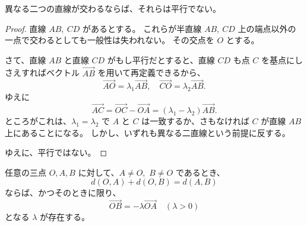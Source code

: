 \begin{thm}
  異なる二つの直線が交わるならば、それらは平行でない。
\end{thm}

\begin{proof}
  直線 \(AB,\:CD\) があるとする。
  これらが半直線 \(AB,\:CD\) 上の端点以外の一点で交わるとしても一般性は失われない。
  その交点を \(O\) とする。

  さて、直線 \(AB\) と直線 \(CD\) がもし平行だとすると、直線 \(CD\) も点 \(C\) を基点にしさえすればベクトル \(\overrightarrow{AB}\) を用いて再定義できるから、
  \[\overrightarrow{AO}=\lambda_1\overrightarrow{AB},\quad \overrightarrow{CO}=\lambda_2\overrightarrow{AB}.\]
  ゆえに
  \[\overrightarrow{AC}=\overrightarrow{OC}-\overrightarrow{OA}=(\lambda_1-\lambda_2)\overrightarrow{AB}.\]
  ところがこれは、\(\lambda_1=\lambda_2\) で \(A\) と \(C\) は一致するか、さもなければ \(C\) が直線 \(AB\) 上にあることになる。
  しかし、いずれも異なる二直線という前提に反する。

  ゆえに、平行ではない。
\end{proof}

\begin{thm}\label{251101145301}
  任意の三点 \(O,A,B\) に対して、\(A\neq O,\) \(B\neq O\) であるとき、
  \[d(O,A)+d(O,B)=d(A,B)\]
  ならば、かつそのときに限り、
  \[\overrightarrow{OB}=-\lambda\overrightarrow{OA} \quad (\lambda>0)\]
  となる \(\lambda\) が存在する。
\end{thm}

